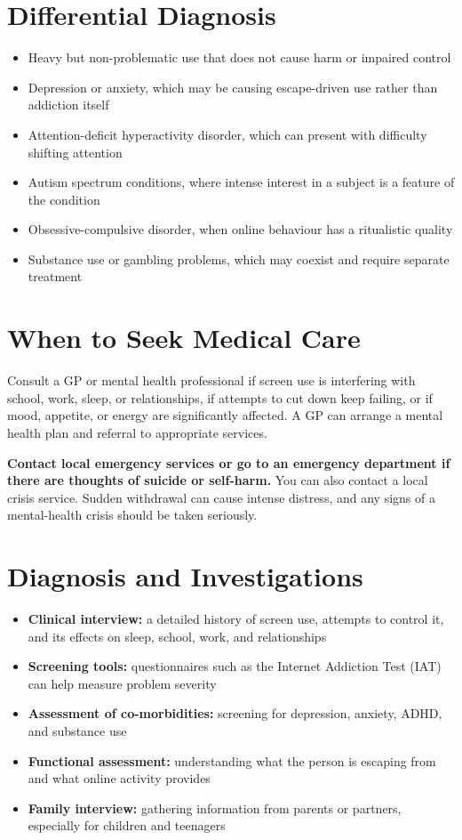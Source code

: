 \section*{Differential Diagnosis}
\begin{itemize}
    \item Heavy but non-problematic use that does not cause harm or impaired control
    \item Depression or anxiety, which may be causing escape-driven use rather than addiction itself
    \item Attention-deficit hyperactivity disorder, which can present with difficulty shifting attention
    \item Autism spectrum conditions, where intense interest in a subject is a feature of the condition
    \item Obsessive-compulsive disorder, when online behaviour has a ritualistic quality
    \item Substance use or gambling problems, which may coexist and require separate treatment
\end{itemize}

\section*{When to Seek Medical Care}
Consult a GP or mental health professional if screen use is interfering with school, work, sleep, or relationships, if attempts to cut down keep failing, or if mood, appetite, or energy are significantly affected. A GP can arrange a mental health plan and referral to appropriate services.

\textbf{Contact local emergency services or go to an emergency department if there are thoughts of suicide or self-harm.} You can also contact a local crisis service. Sudden withdrawal can cause intense distress, and any signs of a mental-health crisis should be taken seriously.

\section*{Diagnosis and Investigations}
\begin{itemize}
    \item \textbf{Clinical interview:} a detailed history of screen use, attempts to control it, and its effects on sleep, school, work, and relationships
    \item \textbf{Screening tools:} questionnaires such as the Internet Addiction Test (IAT) can help measure problem severity
    \item \textbf{Assessment of co-morbidities:} screening for depression, anxiety, ADHD, and substance use
    \item \textbf{Functional assessment:} understanding what the person is escaping from and what online activity provides
    \item \textbf{Family interview:} gathering information from parents or partners, especially for children and teenagers
\end{itemize}

